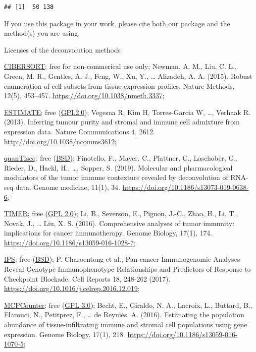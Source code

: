 \documentclass[
  12pt,
]{book}
\begin{document}
\begin{verbatim}
## [1]  50 138
\end{verbatim}

If you use this package in your work, please cite both our package and the method(s) you are using.

Licenses of the deconvolution methods

\href{https://cibersort.stanford.edu/}{CIBERSORT}; free for non-commerical use only; Newman, A. M., Liu, C. L., Green, M. R., Gentles, A. J., Feng, W., Xu, Y., \ldots{} Alizadeh, A. A. (2015). Robust enumeration of cell subsets from tissue expression profiles. Nature Methods, 12(5), 453--457. \url{https://doi.org/10.1038/nmeth.3337};

\href{https://bioinformatics.mdanderson.org/public-software/estimate/}{ESTIMATE}; free (\href{https://bioinformatics.mdanderson.org/estimate/}{GPL2.0}); Vegesna R, Kim H, Torres-Garcia W, \ldots, Verhaak R. (2013). Inferring tumour purity and stromal and immune cell admixture from expression data. Nature Communications 4, 2612. \url{http://doi.org/10.1038/ncomms3612};

\href{http://icbi.at/software/quantiseq/doc/index.html}{quanTIseq}; free (\href{https://github.com/icbi-lab/immunedeconv/blob/master/LICENSE.md}{BSD}); Finotello, F., Mayer, C., Plattner, C., Laschober, G., Rieder, D., Hackl, H., \ldots, Sopper, S. (2019). Molecular and pharmacological modulators of the tumor immune contexture revealed by deconvolution of RNA-seq data. Genome medicine, 11(1), 34. \url{https://doi.org/10.1186/s13073-019-0638-6};

\href{http://cistrome.org/TIMER/}{TIMER}; free (\href{http://cistrome.org/TIMER/download.html}{GPL 2.0}); Li, B., Severson, E., Pignon, J.-C., Zhao, H., Li, T., Novak, J., \ldots{} Liu, X. S. (2016). Comprehensive analyses of tumor immunity: implications for cancer immunotherapy. Genome Biology, 17(1), 174. \url{https://doi.org/10.1186/s13059-016-1028-7};

\href{https://github.com/icbi-lab/Immunophenogram}{IPS}; free (\href{https://github.com/icbi-lab/Immunophenogram/blob/master/LICENSE}{BSD}); P. Charoentong et al., Pan-cancer Immunogenomic Analyses Reveal Genotype-Immunophenotype Relationships and Predictors of Response to Checkpoint Blockade. Cell Reports 18, 248-262 (2017). \url{https://doi.org/10.1016/j.celrep.2016.12.019};

\href{https://github.com/ebecht/MCPcounter}{MCPCounter}; free (\href{https://github.com/ebecht/MCPcounter/blob/master/Source/License}{GPL 3.0}); Becht, E., Giraldo, N. A., Lacroix, L., Buttard, B., Elarouci, N., Petitprez, F., \ldots{} de Reyniès, A. (2016). Estimating the population abundance of tissue-infiltrating immune and stromal cell populations using gene expression. Genome Biology, 17(1), 218. \url{https://doi.org/10.1186/s13059-016-1070-5};
\end{document}
